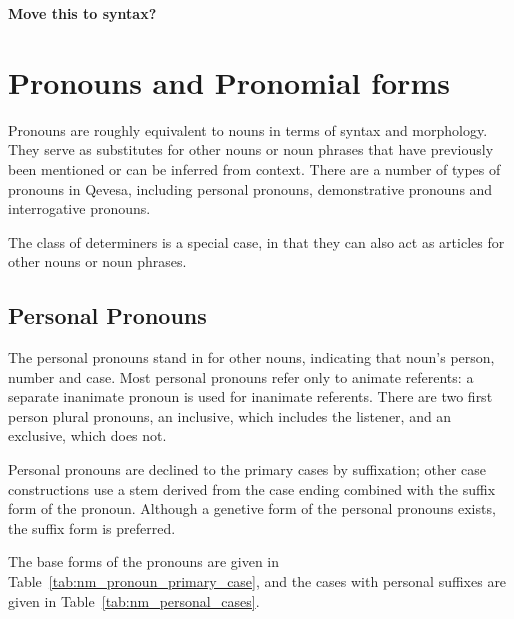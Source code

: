 \documentclass[grammar]{subfiles}
\begin{document}
	\textbf{Move this to syntax?}

	\section{Pronouns and Pronomial forms}
	\label{sec:nm_pronouns}

	Pronouns are roughly equivalent to nouns in terms of syntax and morphology. They serve as substitutes for other nouns or noun phrases that have previously been mentioned or can be inferred from context. There are a number of types of pronouns in Qevesa, including personal pronouns, demonstrative pronouns and interrogative pronouns.

	The class of determiners is a special case, in that they can also act as articles for other nouns or noun phrases.

	\subsection{Personal Pronouns}
	\label{ssec:nm_personal_pronouns}

	The personal pronouns stand in for other nouns, indicating that noun's person, number and case. Most personal pronouns refer only to animate referents: a separate inanimate pronoun is used for inanimate referents. There are two first person plural pronouns, an inclusive, which includes the listener, and an exclusive, which does not. 

	Personal pronouns are declined to the primary cases by suffixation; other case constructions use a stem derived from the case ending combined with the suffix form of the pronoun. Although a genetive form of the personal pronouns exists, the suffix form is preferred. 

	The base forms of the pronouns are given in Table~\ref{tab:nm_pronoun_primary_case}, and the cases with personal suffixes are given in Table~\ref{tab:nm_personal_cases}.
\end{document}
